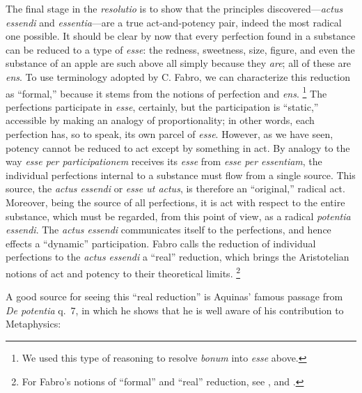The final stage in the \emph{resolutio} is to show that the principles discovered—\emph{actus essendi} and \emph{essentia}—are a true act-and-potency pair, indeed the most radical one possible. It should be clear by now that every perfection found in a substance can be reduced to a type of \emph{esse}: the redness, sweetness, size, figure, and even the substance of an apple are such above all simply because they \emph{are}; all of these are \emph{ens}. To use terminology adopted by C. Fabro, we can characterize this reduction as “formal,” because it stems from the notions of perfection and \emph{ens}.%
%
\footnote{We used this type of reasoning to resolve \emph{bonum} into \emph{esse} above.} The perfections participate in \emph{esse}, certainly, but the participation is “static,” accessible by making an analogy of proportionality; in other words, each perfection has, so to speak, its own parcel of \emph{esse}. However, as we have seen, potency cannot be reduced to act except by something in act. By analogy to the way \emph{esse per participationem} receives its \emph{esse} from \emph{esse per essentiam}, the individual perfections internal to a substance must flow from a single source. This source, the \emph{actus essendi} or \emph{esse ut actus}, is therefore an “original,” radical act. Moreover, being the source of all perfections, it is act with respect to the entire substance, which must be regarded, from this point of view, as a radical \emph{potentia essendi}. The \emph{actus essendi} communicates itself to the perfections, and hence effects a “dynamic” participation. Fabro calls the reduction of individual perfections to the \emph{actus essendi} a “real” reduction, which brings the Aristotelian notions of act and potency to their theoretical limits.%
%
\footnote{For Fabro’s notions of “formal” and “real” reduction, see \cite[108-109]{fabro:problematica}, and \cite[186-187]{fabro:partecipazione}.}

A good source for seeing this “real reduction” is Aquinas’ famous passage from \emph{De potentia} q.~7, in which he shows that he is well aware of his contribution to Metaphysics:

